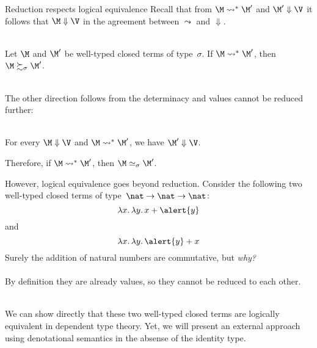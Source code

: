 \begin{frame}{Reduction respects logical equivalence}
  Recall that from $\M \leadsto^* \M'$ and $\M' \Downarrow \V$
  it follows that $\M \Downarrow \V$ in the agreement between $\leadsto$ and
  $\Downarrow$. 
  \\~\\
  \begin{proposition}
    Let $\M$ and $\M'$ be well-typed closed terms of type~$\sigma$. 
    If $\M \leadsto^* \M'$, then $\M \succsim_\sigma \M'$. 
  \end{proposition}
  ~\\
  The other direction follows from the determinacy and values cannot be
  reduced further:
  \\~\\
  \begin{proposition}
    For every $\M \Downarrow \V$ and $\M \leadsto^* \M'$, 
    we have $\M' \Downarrow \V$. 
  \end{proposition}
  Therefore, if $\M \leadsto^* \M'$, then $\M \simeq_\sigma \M'$. 
\end{frame}
\begin{frame}
  However, logical equivalence goes beyond reduction.  
  Consider the following two well-typed closed terms of type~$\nat\to\nat\to\nat$:
    \[
      \lambda x.\, \lambda y.\, x + \alert{y}
    \]
    and 
    \[
      \lambda x.\, \lambda y.\, \alert{y} + x
    \]
    Surely the addition of natural numbers are commutative, but \emph{why?}
    \\~\\

    By definition they are already values, so they cannot be reduced to
    each other. 
    \\~\\
    \begin{remark}
      We can show directly that these two well-typed closed terms are logically
      equivalent in dependent type theory. Yet, we will present an external
      approach using denotational semantics in the absense of
      the identity type. 
    \end{remark}
\end{frame}


